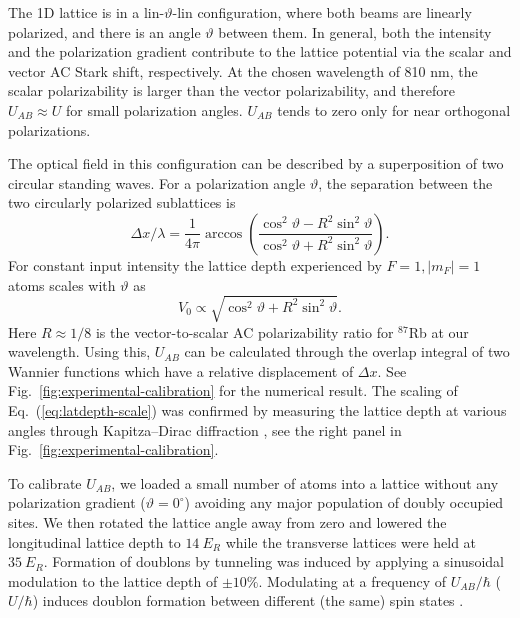 The 1D lattice is in a lin-$\vartheta$-lin configuration, where both beams are linearly polarized, and there is an angle $\vartheta$ between them. In general, both the intensity and the polarization gradient contribute to the lattice potential via the scalar and vector AC Stark shift, respectively. At the chosen wavelength of 810 nm, the scalar polarizability is larger than the vector polarizability, and therefore $U_{AB} \approx U$ for small polarization angles.  $U_{AB}$ tends to zero only for near orthogonal polarizations.

The optical field in this configuration can be described by a superposition of two circular standing waves.  
For a polarization angle $\vartheta$, the separation between the two circularly polarized sublattices is
\begin{equation}
\label{eq:interwell-separation}
\Delta x / \lambda = \frac{1}{4\pi} \arccos \left( \frac{\cos^2\vartheta - R^2\sin^2\vartheta}{\cos^2\vartheta + R^2\sin^2\vartheta} \right).
\end{equation}
For constant input intensity the lattice depth experienced by $F = 1, |m_F| = 1$ atoms scales with $\vartheta$ as
\begin{equation}
\label{eq:latdepth-scale}
    V_0 \propto \sqrt{\cos^2\vartheta + R^2\sin^2\vartheta}.
\end{equation}
Here $R\approx 1/8$ is the vector-to-scalar AC polarizability ratio for $^{87}$Rb at our wavelength. Using this, $U_{AB}$ can be calculated through the overlap integral of two Wannier functions which have a relative displacement of $\Delta x$. See Fig.~\ref{fig:experimental-calibration} for the numerical result. The scaling of Eq.~(\ref{eq:latdepth-scale}) was confirmed by measuring the lattice depth at various angles through Kapitza--Dirac diffraction \cite{Gould86}, see the right panel in Fig.~\ref{fig:experimental-calibration}.

To calibrate $U_{AB}$, we loaded a small number of atoms into a lattice without any polarization gradient ($\vartheta = 0^\circ$) avoiding any major population of doubly occupied sites.  We then rotated the lattice angle away from zero and lowered the longitudinal lattice depth to $14~E_R$ while the transverse lattices were held at $35~E_R$. Formation of doublons by tunneling was induced by applying a sinusoidal modulation to the lattice depth of $\pm 10\%$. Modulating at a frequency of $U_{AB}/\hbar$ ($U/\hbar$) induces doublon formation between different (the same) spin states \cite{Sias08, Ma11}.

